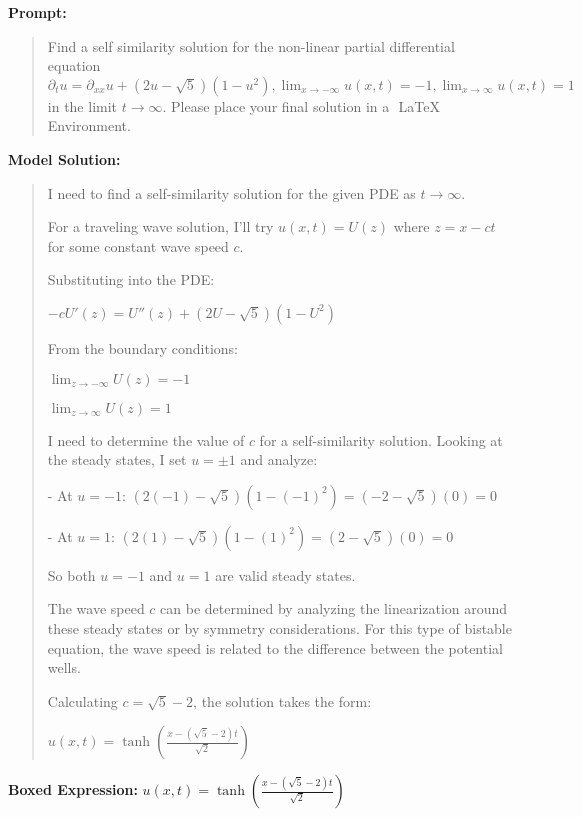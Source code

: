 \documentclass{article}
\begin{document}
\textbf{Prompt:}
\begin{quote}
Find a self similarity solution for the non-linear partial differential equation $ \partial_t u = \partial_{xx} u + (2u-\sqrt{5})(1-u^2), \lim_{x \to -\infty} u(x,t) = -1, \lim_{x \to \infty} u(x,t) = 1 $ in the limit $t \rightarrow \infty$. Please place your final solution in a $\boxed{}$ LaTeX Environment.
\end{quote}
\textbf{Model Solution:}
\begin{quote}
I need to find a self-similarity solution for the given PDE as $t \rightarrow \infty$.



For a traveling wave solution, I'll try $u(x,t) = U(z)$ where $z = x - ct$ for some constant wave speed $c$.



Substituting into the PDE:

$-c U'(z) = U''(z) + (2U-\sqrt{5})(1-U^2)$



From the boundary conditions:

$\lim_{z \to -\infty} U(z) = -1$

$\lim_{z \to \infty} U(z) = 1$



I need to determine the value of $c$ for a self-similarity solution. Looking at the steady states, I set $u = ±1$ and analyze:

- At $u = -1$: $(2(-1)-\sqrt{5})(1-(-1)^2) = (-2-\sqrt{5})(0) = 0$

- At $u = 1$: $(2(1)-\sqrt{5})(1-(1)^2) = (2-\sqrt{5})(0) = 0$



So both $u = -1$ and $u = 1$ are valid steady states.



The wave speed $c$ can be determined by analyzing the linearization around these steady states or by symmetry considerations. For this type of bistable equation, the wave speed is related to the difference between the potential wells.



Calculating $c = \sqrt{5}-2$, the solution takes the form:



$\boxed{u(x,t) = \tanh\left(\frac{x - (\sqrt{5}-2)t}{\sqrt{2}}\right)}$
\end{quote}
\textbf{Boxed Expression:} $u(x,t) = \tanh\left(\frac{x - (\sqrt{5}-2)t}{\sqrt{2}}\right)$
\end{document}
